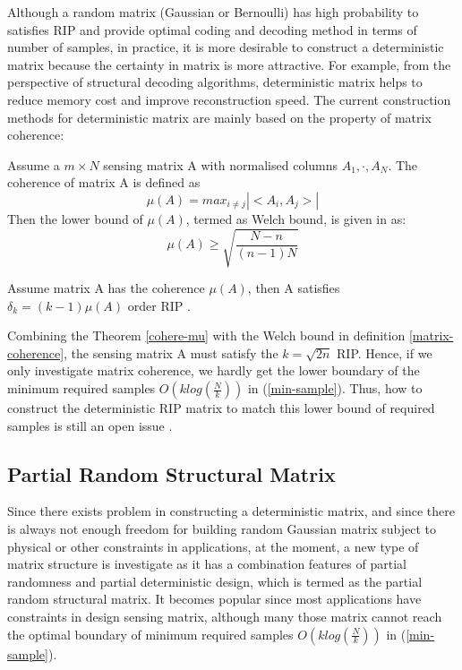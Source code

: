 Although a random matrix (Gaussian or Bernoulli) has high probability to satisfies RIP and provide optimal coding and decoding method in terms of number of samples, in practice, it is more desirable to construct a deterministic matrix because the certainty in matrix is more attractive. For example, from the perspective of structural decoding algorithms, deterministic matrix helps to reduce memory cost and improve reconstruction speed. The current construction methods for deterministic matrix are mainly based on the property of matrix coherence:
\begin{Def}
\label{matrix-coherence}
Assume a $m \times N$ sensing matrix A with normalised columns $A_1, \cdot, A _N$. The coherence of matrix A is defined as
\begin{equation}
\mu(A) = max_{i \neq j} | < A_i, A_j > |
\end{equation}
Then the lower bound of $\mu(A)$, termed as Welch bound, is given in \cite{welch1974lower} as:
\begin{equation}
\mu(A) \geq \sqrt{\frac{N-n}{(n-1)N}}
\end{equation}
\end{Def}
\begin{theorem}
\label{cohere-mu}
Assume matrix A has the coherence $\mu(A)$, then A satisfies $\delta_k = (k-1) \mu(A)$ order RIP \cite{weil1948some}.
\end{theorem}
Combining the Theorem \ref{cohere-mu} with the Welch bound in definition \ref{matrix-coherence}, the sensing matrix A must satisfy the $k = \sqrt{2n}$ RIP. Hence, if we only investigate matrix coherence, we hardly get the lower boundary of the minimum required samples $O(k log(\frac{N}{k}))$ in (\ref{min-sample}). Thus, how to construct the deterministic RIP matrix to match this lower bound of required samples is still an open issue \cite{xu2011deterministic}.

\subsection{Partial Random Structural Matrix}

Since there exists problem in constructing a deterministic matrix, and since there is always not enough freedom for building random Gaussian matrix subject to physical or other constraints in applications, at the moment, a new type of matrix structure is investigate as it has a combination features of partial randomness and partial deterministic design, which is termed as the partial random structural matrix. It becomes popular since most applications have constraints in design sensing matrix, although many those matrix cannot reach the optimal boundary of minimum required samples $O(k log(\frac{N}{k}))$ in (\ref{min-sample}).

